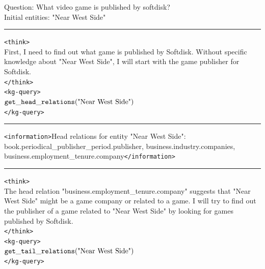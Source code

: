 \begin{table}[H]
\centering
\caption{Example \framework{} response in . \textcolor{blue}{Blue} denotes responses generated by the \framework{} agent.}
\begin{reasonbox}[title=\framework{} Response Example — \dataset{GrailQA}]
Question: What video game is published by softdisk? \\
Initial entities: "Near West Side"
\vspace{0.5em}\hrule\vspace{0.5em}

\begin{blueblock}
\texttt{<think>} \\
First, I need to find out what game is published by Softdisk. Without specific knowledge about "Near West Side", I will start with the game publisher for Softdisk. \\
\texttt{</think>} \\
\texttt{<kg-query>} \\
$\mathtt{get\_head\_relations}(\text{"Near West Side"})$ \\
\texttt{</kg-query>}
\end{blueblock}

\vspace{0.5em}\hrule\vspace{0.5em}

\texttt{<information>}Head relations for entity "Near West Side": \\
book.periodical\_publisher\_period.publisher, business.industry.companies, business.employment\_tenure.company\texttt{</information>}

\vspace{0.5em}\hrule\vspace{0.5em}

\begin{blueblock}
\texttt{<think>} \\
The head relation "business.employment\_tenure.company" suggests that "Near West Side" might be a game company or related to a game. I will try to find out the publisher of a game related to "Near West Side" by looking for games published by Softdisk. \\
\texttt{</think>} \\
\texttt{<kg-query>} \\
$\mathtt{get\_tail\_relations}(\text{"Near West Side"})$ \\
\texttt{</kg-query>}
\end{blueblock}


\end{reasonbox}
\end{table}
